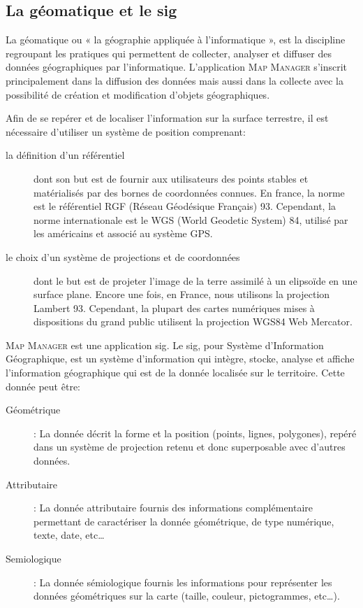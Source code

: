 \documentclass{rapportUHA40}
\begin{document}
\subsection{La géomatique et le \gls{sig}}
La géomatique ou « la géographie appliquée à l'informatique », est la
discipline regroupant les pratiques qui permettent de collecter, analyser et
diffuser des données géographiques par l'informatique. L'application
\textsc{Map Manager} s'inscrit principalement dans la diffusion des données
mais aussi dans la collecte avec la possibilité de création et modification
d'objets géographiques.

Afin de se repérer et de localiser l'information sur la surface terrestre, il
est nécessaire d'utiliser un système de position comprenant:
\begin{description}
  \item[la définition d'un référentiel] dont son but est de fournir aux utilisateurs
    des points stables et matérialisés par des bornes de coordonnées connues. En
    france, la norme est le référentiel RGF (Réseau Géodésique Français) 93.
    Cependant, la norme internationale est le WGS (World Geodetic System) 84,
    utilisé par les américains et associé au système GPS\@.

  \item[le choix d'un système de projections et de coordonnées] dont le but est de
    projeter l'image de la terre assimilé à un elipsoïde en une surface plane.
    Encore une fois, en France, nous utilisons la projection Lambert 93. Cependant,
    la plupart des cartes numériques mises à dispositions du grand public utilisent
    la projection WGS84 Web Mercator.
\end{description}


\textsc{Map Manager} est une application \gls{sig}. Le \gls{sig}, pour Système d'Information Géographique, est un système d’information
qui intègre, stocke, analyse et affiche l'information géographique qui est de
la donnée localisée sur le territoire. Cette donnée peut être:
\begin{description}
  \item[Géométrique]: La donnée décrit la forme et la position (points, lignes,
  polygones), repéré dans un système de projection retenu et donc superposable
  avec d'autres données.
  \item[Attributaire]: La donnée attributaire fournis des informations complémentaire
  permettant de caractériser la donnée géométrique, de type numérique, texte,
  date, etc\ldots
  \item[Semiologique]: La donnée sémiologique fournis les informations pour représenter
  les données géométriques sur la carte (taille, couleur, pictogrammes,
  etc\ldots).
\end{description}
\end{document}
